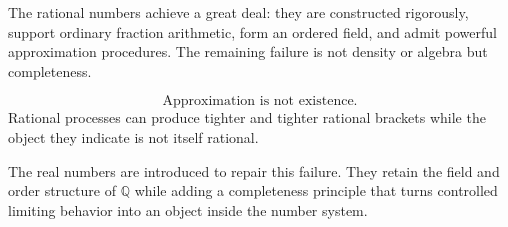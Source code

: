 
\label{sec:transition-from-q-to-r}

\begin{exposition}
The rational numbers achieve a great deal: they are constructed rigorously, support ordinary fraction arithmetic, form an ordered field, and admit powerful approximation procedures.  The remaining failure is not density or algebra but completeness.
\end{exposition}

\begin{remark*}
\[
\text{Approximation is not existence.}
\]
Rational processes can produce tighter and tighter rational brackets while the object they indicate is not itself rational.
\end{remark*}

\begin{remark*}[Transition]
The real numbers are introduced to repair this failure.  They retain the field and order structure of $\mathbb{Q}$ while adding a completeness principle that turns controlled limiting behavior into an object inside the number system.
\end{remark*}
